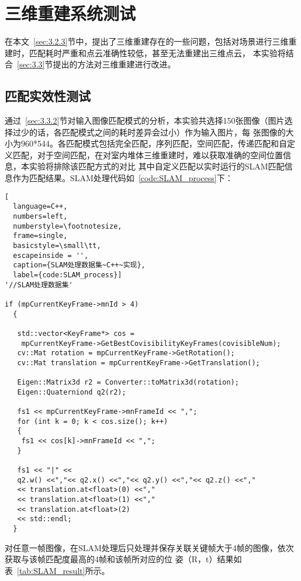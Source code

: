 \section{三维重建系统测试}
\label{sec:5.3}
在本文~\ref{sec:3.2.3}节中，提出了三维重建存在的一些问题，包括对场景进行三维重建时，匹配耗时严重和点云准确性较低，甚至无法重建出三维点云，
本实验将结合~\ref{sec:3.3}节提出的方法对三维重建进行改进。
\subsection{匹配实效性测试}
通过~\ref{sec:3.3.2}节对输入图像匹配模式的分析，本实验共选择150张图像（图片选择过少的话，各匹配模式之间的耗时差异会过小）作为输入图片，每
张图像的大小为960*544。各匹配模式包括完全匹配，序列匹配，空间匹配，传递匹配和自定义匹配，对于空间匹配，在对室内堆体三维重建时，难以获取准确的空间位置信息，本实验将排除该匹配方式的对比
其中自定义匹配以实时运行的SLAM匹配信息作为匹配结果。SLAM处理代码如~\ref{code:SLAM_process}下：
\begin{lstlisting}[
  language=C++,
  numbers=left,                
  numberstyle=\footnotesize,
  frame=single,     
  basicstyle=\small\tt,    
  escapeinside = '',
  caption={SLAM处理数据集~C++~实现},
  label={code:SLAM_process}]
'//SLAM处理数据集'

if (mpCurrentKeyFrame->mnId > 4)
  {

   std::vector<KeyFrame*> cos = 
    mpCurrentKeyFrame->GetBestCovisibilityKeyFrames(covisibleNum);
   cv::Mat rotation = mpCurrentKeyFrame->GetRotation();
   cv::Mat translation = mpCurrentKeyFrame->GetTranslation();

   Eigen::Matrix3d r2 = Converter::toMatrix3d(rotation);
   Eigen::Quaterniond q2(r2);

   fs1 << mpCurrentKeyFrame->mnFrameId << ",";
   for (int k = 0; k < cos.size(); k++)
   {
    fs1 << cos[k]->mnFrameId << ",";
   }

   fs1 << "|" << 
   q2.w() <<","<< q2.x() <<","<< q2.y() <<","<< q2.z() <<","
   << translation.at<float>(0) <<","
   << translation.at<float>(1) <<","
   << translation.at<float>(2) 
   << std::endl;
  }

\end{lstlisting}

对任意一帧图像，在SLAM处理后只处理并保存关联关键帧大于4帧的图像，依次获取与该帧匹配度最高的4帧和该帧所对应的位
姿（R，t）结果如表~\ref{tab:SLAM_result}所示。

